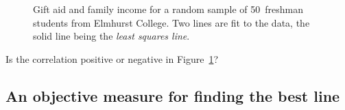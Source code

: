 \begin{figure}[h]
  \centering
  \caption{Gift aid and family income for a random sample of
      50~freshman students from Elmhurst College.
      Two lines are fit to the data, the solid line being the
      \emph{least squares line}.}
  \label{elmhurstScatterW2Lines}
\end{figure}

\begin{exercisewrap}
\begin{nexercise}
Is the correlation positive or negative in Figure~\ref{elmhurstScatterW2Lines}?\footnotemark
\end{nexercise}
\end{exercisewrap}


\subsection{An objective measure for finding the best line}

